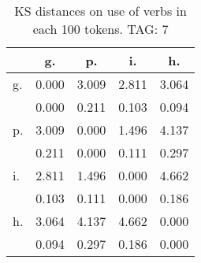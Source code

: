 \begin{table}[h!]
\begin{center}
\begin{tabular}{| l | c | c | c | c |}\hline
 & g. & p. & i. & h. \\\hline
g. & 0.000  & 3.009  & 2.811  & 3.064 \\\hline
 & 0.000  & 0.211  & 0.103  & 0.094 \\\hline
p. & 3.009  & 0.000  & 1.496  & 4.137 \\\hline
 & 0.211  & 0.000  & 0.111  & 0.297 \\\hline
i. & 2.811  & 1.496  & 0.000  & 4.662 \\\hline
 & 0.103  & 0.111  & 0.000  & 0.186 \\\hline
h. & 3.064  & 4.137  & 4.662  & 0.000 \\\hline
 & 0.094  & 0.297  & 0.186  & 0.000 \\\hline
\end{tabular}
\caption{KS distances on use of verbs in each 100 tokens. TAG: 7}
\end{center}
\end{table}
